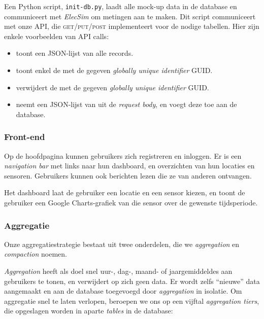 \documentclass[12pt,draft,parskip=full]{article}
\begin{document}
Een Python script, \texttt{init-db.py}, laadt alle mock-up data in de database 
en communiceert met \textit{ElecSim} om metingen aan te maken. Dit script 
communiceert met onze API, die \textsc{get/put/post} implementeert voor de 
nodige tabellen. Hier zijn enkele voorbeelden van API calls:
\begin{itemize}
  \item {} toont een JSON-lijst van alle  
  records.
  \item {} toont enkel de 
   met de 
  gegeven \textit{globally unique identifier} GUID.
  \item {} verwijdert de
   met de gegeven \textit{globally unique identifier} GUID.
  \item {} neemt een JSON-lijst van  
  uit de \textit{request body}, en voegt deze toe aan de database.
  
\end{itemize}

\subsubsection{Front-end}
Op de hoofdpagina kunnen gebruikers zich registreren en inloggen. Er is een 
\textit{navigation bar} met links naar hun dashboard, en overzichten van hun locaties en sensoren. Gebruikers kunnen ook berichten lezen die ze van anderen ontvangen.

Het dashboard laat de gebruiker een locatie en een sensor kiezen, en toont de gebruiker een Google Charts-grafiek van die sensor over de gewenste 
tijdsperiode.

\subsubsection{Aggregatie}

Onze aggregatiestrategie bestaat uit twee onderdelen, die we \emph{aggregation} en \emph{compaction} noemen. 

\emph{Aggregation} heeft als doel snel uur-, dag-, maand- of jaargemiddeldes aan gebruikers te tonen, en verwijdert op zich geen data. Er wordt zelfs ``nieuwe'' data aangemaakt en aan de database toegevoegd door \emph{aggregation} in isolatie. Om aggregatie snel te laten verlopen, beroepen we ons op een vijftal \emph{aggregation tiers}, die opgeslagen worden in aparte \emph{tables} in de database:
\end{document}
